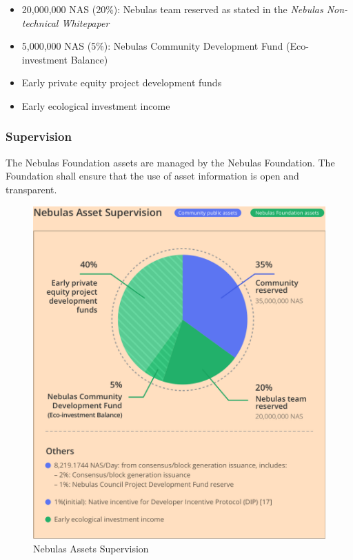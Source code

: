 \begin{itemize}
	\item 20,000,000 NAS (20\%): Nebulas team reserved as stated in the \textit{Nebulas Non-technical Whitepaper}
    \item 5,000,000 NAS (5\%): Nebulas Community Development Fund (Eco-investment Balance)
	\item Early private equity project development funds
	\item Early ecological investment income
\end{itemize}

\subsubsection{Supervision}

The Nebulas Foundation assets are managed by the Nebulas Foundation. The Foundation shall ensure that the use of asset information is open and transparent.

\begin{figure}
	\centering
	\includegraphics[width=1\textwidth]{../common/en/assets.png}
	\caption{Nebulas Assets Supervision \label{fig:assets}}
\end{figure}